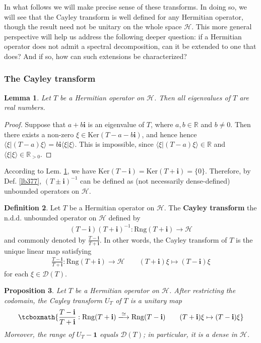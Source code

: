 \documentclass[12pt,b5paper,notitlepage]{article}
\theoremstyle{definition}
\newtheorem{df}{Definition}[subsection]
\theoremstyle{plain}
\newtheorem{pp}[df]{Proposition}
\newtheorem{lm}[df]{Lemma}
\newcommand{\idt}{\mathbf{1}}
\newcommand{\Dom}{\mathscr{D}}
\newcommand{\bk}[1]{\langle {#1}\rangle}
\newcommand{\im}{\mathbf{i}}
\newcommand{\Rbb}{\mathbb R}
\newcommand{\Ker}{\mathrm{Ker}}
\newcommand{\Rng}{\mathrm{Rng}}
\newcommand{\dps}{\displaystyle}
\newcommand{\MH}{\mathcal H}
\numberwithin{equation}{section}
\begin{document}
In what follows we will make precise sense of these transforms. In doing so, we will see that the Cayley transform is well defined for any Hermitian operator, though the result need not be unitary on the whole space $\MH$. This more general perspective will help us address the following deeper question: if a Hermitian operator does not admit a spectral decomposition, can it be extended to one that does? And if so, how can such extensions be characterized?



\subsubsection{The Cayley transform}


\begin{lm}\label{lb376}
Let $T$ be a Hermitian operator on $\MH$. Then all eigenvalues of $T$ are real numbers.
\end{lm}



\begin{proof}
Suppose that $a+b\im$ is an eigenvalue of $T$, where $a,b\in\Rbb$ and $b\neq0$. Then there exists a non-zero $\xi\in\Ker(T-a-b\im)$, and hence hence $\bk{\xi|(T-a)\xi}=b\im\bk{\xi|\xi}$. This is impossible, since $\bk{\xi|(T-a)\xi}\in\Rbb$ and $\bk{\xi|\xi}\in\Rbb_{>0}$.
\end{proof}


According to Lem. \ref{lb376}, we have $\Ker(T-\im)=\Ker(T+\im)=\{0\}$. Therefore, by Def. \ref{lb377}, $(T\pm\im)^{-1}$ can be defined as (not necessarily dense-defined) unbounded operators on $\MH$.


\begin{df}\label{lb379}
Let $T$ be a Hermitian operator on $\MH$. The \textbf{Cayley transform}  the n.d.d. unbounded operator on $\MH$ defined by
\begin{align*}
(T-\im)(T+\im)^{-1}:\Rng(T+\im)\rightarrow\MH
\end{align*}
and commonly denoted by $\frac{T-\im}{T+\im}$. In other words, the Cayley transform of $T$ is the unique linear map satisfying
\begin{align*}
\dps\frac{T-\im}{T+\im}:\Rng(T+\im)\rightarrow\MH\qquad (T+\im)\xi\mapsto (T-\im)\xi
\end{align*}
for each $\xi\in\Dom(T)$.
\end{df}

\begin{pp}\label{lb380}
Let $T$ be a Hermitian operator on $\MH$. After restricting the codomain, the Cayley transform $U_T$ of $T$ is a unitary map
\begin{align}\label{eq192}
\tcboxmath{\frac{T-\im}{T+\im}:\Rng(T+\im)\xlongrightarrow{\simeq}\Rng(T-\im)\qquad (T+\im)\xi\mapsto (T-\im)\xi}
\end{align}
Moreover, the range of $U_T-\idt$ equals $\Dom(T)$; in particular, it is a dense in $\MH$.
\end{pp}
\end{document}
